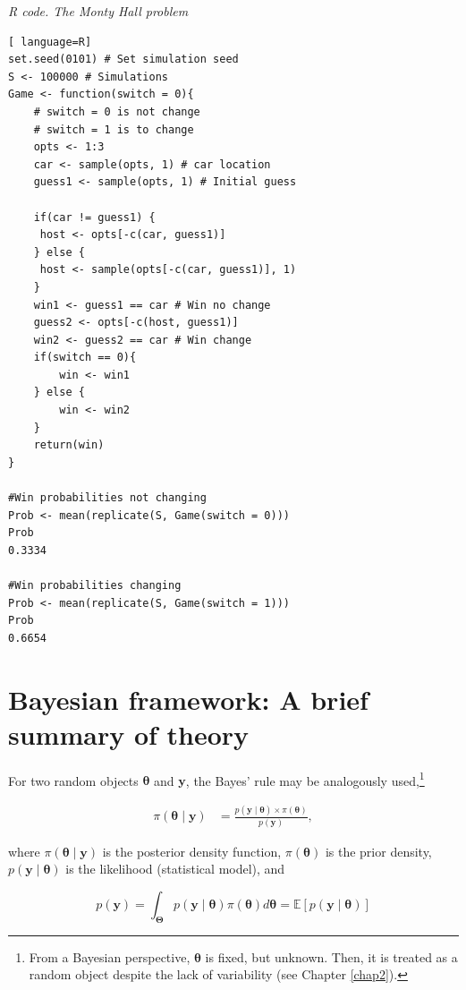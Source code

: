 \begin{tcolorbox}[enhanced,width=4.67in,center upper,
	fontupper=\large\bfseries,drop shadow southwest,sharp corners]
\textit{R code. The Monty Hall problem}
\begin{VF}
\begin{lstlisting}[ language=R]
set.seed(0101) # Set simulation seed
S <- 100000 # Simulations
Game <- function(switch = 0){
	# switch = 0 is not change  
	# switch = 1 is to change
	opts <- 1:3 
	car <- sample(opts, 1) # car location
	guess1 <- sample(opts, 1) # Initial guess 
	
	if(car != guess1) {
	 host <- opts[-c(car, guess1)]
	} else {
	 host <- sample(opts[-c(car, guess1)], 1)
	}	
	win1 <- guess1 == car # Win no change
	guess2 <- opts[-c(host, guess1)]	
	win2 <- guess2 == car # Win change
	if(switch == 0){
		win <- win1
	} else {
		win <- win2
	}
	return(win)
}

#Win probabilities not changing
Prob <- mean(replicate(S, Game(switch = 0))) 
Prob
0.3334

#Win probabilities changing
Prob <- mean(replicate(S, Game(switch = 1))) 
Prob
0.6654
\end{lstlisting}
\end{VF}
\end{tcolorbox}

\section{Bayesian framework: A brief summary of theory}\label{sec12}

For two random objects \( \bm{\theta} \) and \( \mathbf{y} \), the Bayes' rule may be analogously used,\footnote{From a Bayesian perspective, \( \mathbf{\theta} \) is fixed, but unknown. Then, it is treated as a random object despite the lack of variability (see Chapter \ref{chap2}).}


\begin{align}
	\pi(\bm{\theta}\mid \mathbf{y})&=\frac{p(\mathbf{y}\mid \bm{\theta}) \times \pi(\bm{\theta})}{p(\mathbf{y})},
	\label{eq:121}
\end{align}

where $\pi(\bm{\theta}\mid \mathbf{y})$ is the posterior density function, $\pi(\bm{\theta})$ is the prior density, $p(\mathbf{y}\mid \bm{\theta})$ is the likelihood (statistical model), and

\begin{equation}
	p(\mathbf{y})=\int_{\mathbf{\Theta}}p(\mathbf{y}\mid \bm{\theta})\pi(\bm{\theta})d\bm{\theta}=\mathbb{E}\left[p(\mathbf{y}\mid \bm{\theta})\right]
	\label{eq:121a}
\end{equation}

